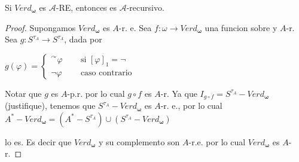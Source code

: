   \begin{lemma} \label{lemma_118}
    \PN Si $Verd_{\mathbf{\omega}}$ es $\mathcal{A}$-RE, entonces es $\mathcal{A}$-recursivo.
  \end{lemma}
  \begin{proof}
    Supongamos $Verd_{\mathbf{\omega }}$ es $A$-r. e. Sea $f:\omega \rightarrow Verd_{\mathbf{\omega }}$ una funcion sobre y $A$-r. Sea $g:S^{\tau _{A}}\rightarrow S^{\tau _{A}}$, dada por

    $\displaystyle g(\varphi )=\left\{ \begin{array}{ccc} ^{\curvearrowright }\varphi & \;\; & \text{si }\left[ \varphi \right] _{1}=\lnot \\ \lnot \varphi & \;\; & \text{caso contrario} \end{array} \right. $

    Notar que $g$ es $A$-p.r. por lo cual $g\circ f$ es $A$-r. Ya que $I_{g\circ f}=S^{\tau _{A}}-Verd_{\mathbf{\omega }}$ (justifique), tenemos que $S^{\tau _{A}}-Verd_{\mathbf{\omega }}$ es $A$-r. e., por lo cual
    $\displaystyle A^{\ast }-Verd_{\mathbf{\omega }}=(A^{\ast }-S^{\tau _{A}})\cup (S^{\tau _{A}}-Verd_{\mathbf{\omega }}) $

    lo es. Es decir que $Verd_{\mathbf{\omega }}$ y su complemento son $A$-r.e. por lo cual $Verd_{\mathbf{\omega }}$ es $A$-r.
  \end{proof}

